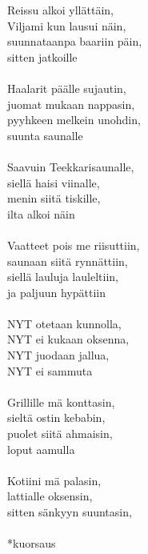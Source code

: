 
Reissu alkoi yllättäin, \\ Viljami kun lausui näin, \\ suunnataanpa baariin päin, \\ sitten jatkoille \\ \hspace{10mm} \\ Haalarit päälle sujautin, \\ juomat mukaan nappasin, \\ pyyhkeen melkein unohdin, \\ suunta saunalle \\ \hspace{10mm} \\ Saavuin Teekkarisaunalle, \\ siellä haisi viinalle, \\ menin siitä tiskille, \\ ilta alkoi näin \\ \hspace{10mm} \\ Vaatteet pois me riisuttiin, \\ saunaan siitä rynnättiin, \\ siellä lauluja lauleltiin, \\ ja paljuun hypättiin \\ \hspace{10mm} \\ NYT otetaan kunnolla, \\ NYT ei kukaan oksenna, \\ NYT juodaan jallua, \\ NYT ei sammuta \\ \hspace{10mm} \\ Grillille mä konttasin, \\ sieltä ostin kebabin, \\ puolet siitä ahmaisin, \\ loput aamulla \\ \hspace{10mm} \\ Kotiini mä palasin, \\ lattialle oksensin, \\ sitten sänkyyn suuntasin, \\ \hspace{10mm} \\ *kuorsaus
